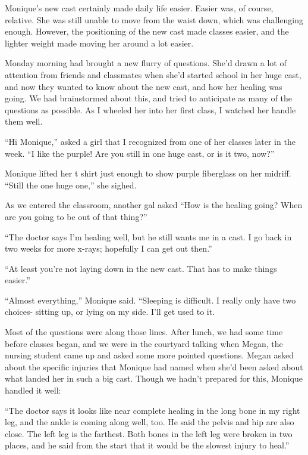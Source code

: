 Monique's new cast certainly made daily life easier. Easier was, of course, relative. She
was still unable to move from the waist down, which was challenging enough. However, the
positioning of the new cast made classes easier, and the lighter weight made moving her around a
lot easier.

Monday morning had brought a new flurry of questions. She'd drawn a lot of attention from
friends and classmates when she'd started school in her huge cast, and now they wanted to know
about the new cast, and how her healing was going. We had brainstormed about this, and tried to
anticipate as many of the questions as possible. As I wheeled her into her first class, I
watched her handle them well.

``Hi Monique,'' asked a girl that I recognized from one of her classes later in the week.
``I like the purple! Are you still in one huge cast, or is it two, now?''

Monique lifted her t shirt just enough to show purple fiberglass on her midriff. ``Still
the one huge one,'' she sighed.

As we entered the classroom, another gal asked ``How is the healing going? When are you
going to be out of that thing?''

``The doctor says I'm healing well, but he still wants me in a cast. I go back in two weeks
for more x-rays; hopefully I can get out then.''

``At least you're not laying down in the new cast. That has to make things easier.''

``Almost everything,'' Monique said. ``Sleeping is difficult. I really only have two
choices- sitting up, or lying on my side. I'll get used to it.

Most of the questions were along those lines. After lunch, we had some time before classes
began, and we were in the courtyard talking when Megan, the nursing student came up and asked
some more pointed questions. Megan asked about the specific injuries that Monique had named when
she'd been asked about what landed her in such a big cast. Though we hadn't prepared for this,
Monique handled it well:

``The doctor says it looks like near complete healing in the long bone in my right leg, and
the ankle is coming along well, too. He said the pelvis and hip are also close. The left leg is
the farthest. Both bones in the left leg were broken in two places, and he said from the start
that it would be the slowest injury to heal.''

